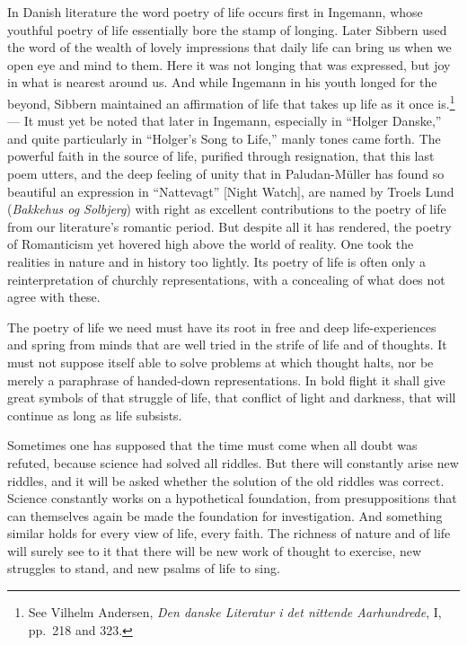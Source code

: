 \documentclass[12pt]{book}
\newcommand{\opage}[1]{\marginnote{\footnotesize\textit{[#1]}}}
\begin{document}
In Danish literature the word poetry of life occurs first in Ingemann, whose youthful poetry of life
essentially bore the stamp of longing. Later Sibbern used the word of the wealth of lovely impressions that
daily life can bring us \opage{121}when we open eye and mind to them. Here it was not longing that was expressed, but joy
in what is nearest around us. And while Ingemann in his youth longed for the beyond, Sibbern maintained an
affirmation of life that takes up life as it once is.\footnote{See Vilhelm Andersen, \textit{Den danske
Literatur i det nittende Aarhundrede}, I, pp.\ 218 and 323.} --- It must yet be noted that later in Ingemann,
especially in ``Holger Danske,'' and quite particularly in ``Holger's Song to Life,'' manly tones came forth.
The powerful faith in the source of life, purified through resignation, that this last poem utters, and the
deep feeling of unity that in Paludan-Müller has found so beautiful an expression in ``Nattevagt'' [Night
Watch], are named by Troels Lund (\textit{Bakkehus og Solbjerg}) with right as excellent contributions to the
poetry of life from our literature's romantic period. But despite all it has rendered, the poetry of
Romanticism yet hovered high above the world of reality. One took the realities in nature and in history too
lightly. Its poetry of life is often only a reinterpretation of churchly representations, with a concealing of
what does not agree with these.

The poetry of life we need must have its root in free and deep life-experiences and spring from minds that are
well tried in the strife of life and of thoughts. It must not suppose itself able to solve problems at which
thought halts, nor be merely a paraphrase of handed-down representations. In bold flight it shall give great
symbols of that struggle of life, that conflict of light and darkness, that will continue as long as life
subsists.

Sometimes one has supposed that the time must come when all doubt was refuted, because science had solved all
riddles. But there will constantly arise new riddles, and it \opage{122}will be asked whether the solution of the old
riddles was correct. Science constantly works on a hypothetical foundation, from presuppositions that can
themselves again be made the foundation for investigation. And something similar holds for every view of life,
every faith. The richness of nature and of life will surely see to it that there will be new work of thought to
exercise, new struggles to stand, and new psalms of life to sing.
\end{document}
